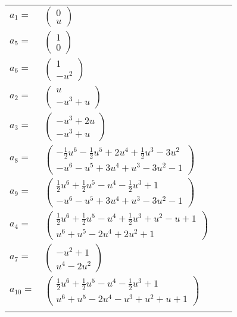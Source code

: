 \documentclass[1p]{elsarticle_modified}
\theoremstyle{definition}
\begin{document}
\begin{tabular}{m{7pt} m{180pt} m{7pt} m{180pt} }
\flushright $a_{1}=$&$\begin{pmatrix}0\\u\end{pmatrix}$ \\
\flushright $a_{5}=$&$\begin{pmatrix}1\\0\end{pmatrix}$ \\
\flushright $a_{6}=$&$\begin{pmatrix}1\\- u^2\end{pmatrix}$ \\
\flushright $a_{2}=$&$\begin{pmatrix}u\\- u^3+u\end{pmatrix}$ \\
\flushright $a_{3}=$&$\begin{pmatrix}- u^3+2 u\\- u^3+u\end{pmatrix}$ \\
\flushright $a_{8}=$&$\begin{pmatrix}-\frac{1}{2} u^6-\frac{1}{2} u^5+2 u^4+\frac{1}{2} u^3-3 u^2\\- u^6- u^5+3 u^4+u^3-3 u^2-1\end{pmatrix}$ \\
\flushright $a_{9}=$&$\begin{pmatrix}\frac{1}{2} u^6+\frac{1}{2} u^5- u^4-\frac{1}{2} u^3+1\\- u^6- u^5+3 u^4+u^3-3 u^2-1\end{pmatrix}$ \\
\flushright $a_{4}=$&$\begin{pmatrix}\frac{1}{2} u^6+\frac{1}{2} u^5- u^4+\frac{1}{2} u^3+u^2- u+1\\u^6+u^5-2 u^4+2 u^2+1\end{pmatrix}$ \\
\flushright $a_{7}=$&$\begin{pmatrix}- u^2+1\\u^4-2 u^2\end{pmatrix}$ \\
\flushright $a_{10}=$&$\begin{pmatrix}\frac{1}{2} u^6+\frac{1}{2} u^5- u^4-\frac{1}{2} u^3+1\\u^6+u^5-2 u^4- u^3+u^2+u+1\end{pmatrix}$\\&\end{tabular}
\end{document}
